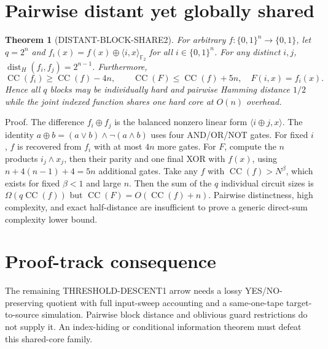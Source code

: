 \documentclass[11pt]{article}
\newtheorem{theorem}{Theorem}
\begin{document}
\section{Pairwise distant yet globally shared}
\begin{theorem}[DISTANT-BLOCK-SHARE2]
For arbitrary $f:\{0,1\}^n\to\{0,1\}$,
let $q=2^n$ and
$f_i(x)=f(x)\oplus\langle i,x\rangle_{\mathbb F_2}$
for all $i\in\{0,1\}^n$.
For any distinct $i,j$,
$\operatorname{dist}_H(f_i,f_j)=2^{n-1}$.
Furthermore,
\[
 \operatorname{CC}(f_i)\ge\operatorname{CC}(f)-4n,
 \qquad
 \operatorname{CC}(F)\le\operatorname{CC}(f)+5n,
 \quad F(i,x)=f_i(x).
\]
Hence all $q$ blocks may be individually hard and
pairwise Hamming distance $1/2$ while the joint
indexed function shares one hard core at $O(n)$ overhead.
\end{theorem}
\noindent Proof. The difference $f_i\oplus f_j$
is the balanced nonzero linear form
$\langle i\oplus j,x\rangle$.
The identity
$a\oplus b=(a\vee b)\wedge\neg(a\wedge b)$
uses four AND/OR/NOT gates.
For fixed $i$, $f$ is recovered from $f_i$
with at most $4n$ more gates.
For $F$, compute the $n$ products $i_j\wedge x_j$,
then their parity and one final XOR with $f(x)$,
using $n+4(n-1)+4=5n$ additional gates.
Take any $f$ with $\operatorname{CC}(f)>N^\beta$,
which exists for fixed $\beta<1$ and large $n$.
Then the sum of the $q$ individual circuit sizes
is $\Omega(q\operatorname{CC}(f))$ but
$\operatorname{CC}(F)=O(\operatorname{CC}(f)+n)$.
Pairwise distinctness, high complexity, and
exact half-distance are insufficient to prove
a generic direct-sum complexity lower bound.
\section{Proof-track consequence}
The remaining THRESHOLD-DESCENT1 arrow needs
a lossy YES/NO-preserving quotient with full
input-sweep accounting and a same-one-tape
target-to-source simulation. Pairwise block
distance and oblivious guard restrictions do
not supply it. An index-hiding or conditional
information theorem must defeat this shared-core family.
\end{document}
